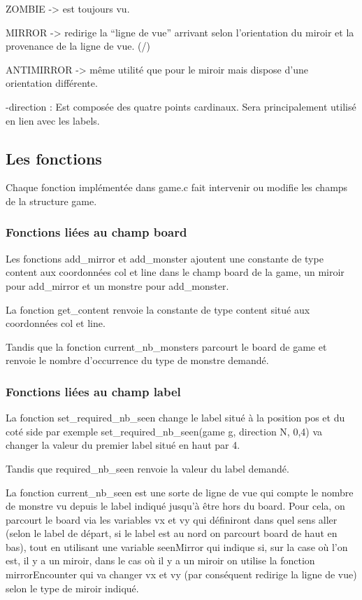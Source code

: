 \documentclass[12]{article}
\begin{document}
     ZOMBIE -> est toujours vu.
     
     MIRROR -> redirige la ``ligne de vue'' arrivant selon l'orientation du miroir et la provenance de la ligne de vue. (/)
     
     ANTIMIRROR -> même utilité que pour le miroir mais dispose d'une orientation différente. 
 
 -direction : Est composée des quatre points cardinaux. Sera principalement utilisé en lien avec les labels.
 
\subsection{Les fonctions}
Chaque fonction implémentée dans game.c fait intervenir ou modifie les champs de la structure game.
\subsubsection{ Fonctions liées au champ board}
Les fonctions add\_mirror et add\_monster ajoutent une constante de type content aux coordonnées col et line dans le champ board de la game, un miroir pour add\_mirror et un monstre pour add\_monster.

  La fonction get\_content renvoie la constante de type content situé aux coordonnées col et line.

  Tandis que la fonction current\_nb\_monsters parcourt le board de game et renvoie le nombre d'occurrence du type de monstre demandé.
\subsubsection{ Fonctions liées au champ label}
La fonction set\_required\_nb\_seen change le label situé à la position pos et du coté side par exemple set\_required\_nb\_seen(game g, direction N, 0,4) va changer la valeur du premier label situé en haut par 4.

Tandis que required\_nb\_seen renvoie la valeur du label demandé.

La fonction current\_nb\_seen  est une sorte de ligne de vue qui compte le nombre de monstre vu depuis le label indiqué jusqu'à être hors du board. Pour cela, on parcourt le board via les variables vx et vy qui définiront dans quel sens aller (selon le label de départ, si le label est au nord on parcourt board de haut en bas), tout en utilisant une variable seenMirror qui indique si, sur la case où l'on est, il y a un miroir, dans le cas où il y a un miroir on utilise la fonction mirrorEncounter qui va changer vx et vy (par conséquent redirige la ligne de vue) selon le type de miroir indiqué.
\end{document}
